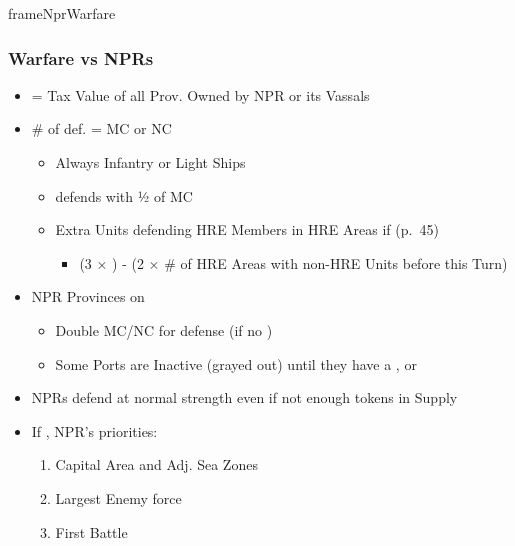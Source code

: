 \documentclass[10pt]{article}
\newlength{\fhNprWarfare} \setlength\fhNprWarfare{20\baselineskip}
\begin{document}
\begin{dynamiccontents*}{frameNprWarfare}\begin{eubox}{\fhNprWarfare}
	\subsubsection*{Warfare vs NPRs }
	\begin{itemize}
		\item {} = Tax Value of all Prov. Owned by NPR or its Vassals
		\item {}\# of def.  = MC or NC
		\begin{itemize}
			\item Always Infantry or Light Ships
			\item {} defends with ½ of MC
			\item Extra Units defending HRE Members in HRE Areas if  (p.~45)
			\begin{itemize}
				\item (3 × \authority) - (2 × \# of HRE Areas with non-HRE Units before this Turn)
			\end{itemize}
		\end{itemize}
		\item NPR Provinces on 
		\begin{itemize}
			\item Double MC/NC for defense (if no \plague)
			\item Some Ports are Inactive (grayed out) until they have a \dnpr, \town or \vassal
		\end{itemize}
		\item NPRs defend at normal strength even if not enough tokens in Supply
		\item If , NPR's priorities:
		\begin{enumerate}
			\item Capital Area and Adj. Sea Zones
			\item Largest Enemy force
			\item First Battle
		\end{enumerate}
	\end{itemize}
\end{eubox}\end{dynamiccontents*}
\end{document}
